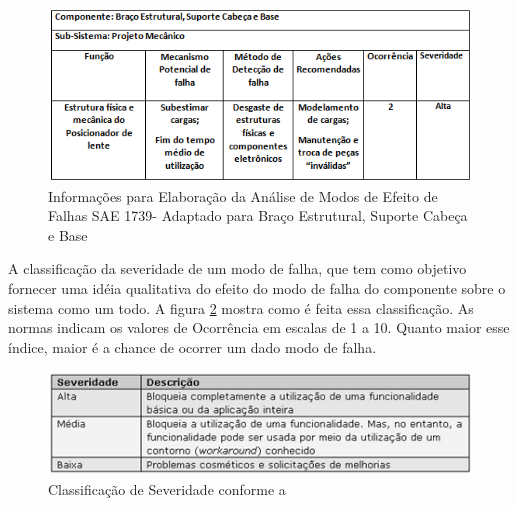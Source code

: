 \begin{figure}[H]
		\centering
			\includegraphics[scale=1.0]{figuras/confibraco.png}
		\caption{Informações para Elaboração da Análise de Modos de Efeito de Falhas SAE 1739- Adaptado para Braço Estrutural, Suporte Cabeça e Base \cite{sae}}
		\label{confibraco}
\end{figure}

A classificação da severidade de um modo de falha, que tem como objetivo fornecer uma idéia qualitativa do efeito do modo de falha do componente sobre o sistema como um todo. A figura \ref{severidade} mostra como é feita essa classificação. As normas indicam os valores de Ocorrência em escalas de 1 a 10. Quanto maior esse índice, maior é a chance de ocorrer um dado modo de falha.

\begin{figure}[H]
		\centering
			\includegraphics[scale=1.0]{figuras/severidade.png}
		\caption{Classificação de Severidade conforme a }
		\label{severidade}
\end{figure}